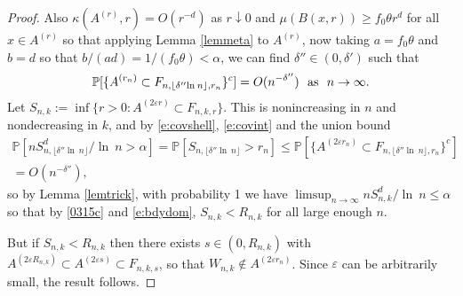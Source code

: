 \documentclass[12pt]{article}
\newcommand{\cX}{\mathcal{X}}
\renewcommand{\Pr}{\mathbb{P}}
\newcommand{\eps}{\varepsilon}
\newcommand{\dist}{{\rm dist}}
\renewcommand{\log}{{\ln \:}}
\begin{document}
\begin{proof}
	Also $\kappa(A^{(r)},r) = O(r^{-d})$ as $r \downarrow 0$ and
	$\mu(B(x,r)) \geq f_0 \theta r^d$ for all $x \in A^{(r)}$ so that
	applying  Lemma \ref{lemmeta} to $A^{(r)}$, now
	taking $a = f_0 \theta$ and $b = d$ so
	that $b/(ad) = 1/ (f_0 \theta) < \alpha$, we can find
	 $\delta'' \in(0,\delta')$ such that
	\begin{align}
		\Pr[  \{ A^{(r_n)}
	\subset F_{n,\lfloor \delta'' \log n \rfloor, r_n} \}^c]
	= O (n^{-\delta''}) ~~ {\rm as}~~ n \to \infty.
		\label{e:covint}
	\end{align}
	Let $S_{n,k}:= \inf \{r >0:A^{(2 \eps r)}
	\subset F_{n,k,r} \}$. This is nonincreasing in $n$ and nondecreasing
	in $k$, and by \eqref{e:covshell}, \eqref{e:covint} 
	and the union bound
	\begin{align*}
	\Pr[  n  S_{n,\lfloor \delta'' \log n\rfloor}^d/\log n > \alpha ] 
	= \Pr[ S_{n,\lfloor \delta'' \log n\rfloor}  > r_n] \leq
		\Pr[ \{A^{(2 \eps 
		r_n)} \subset F_{n,\lfloor \delta'' \log n\rfloor,r_n} \}^c]
		\\
	= O(n^{-\delta''}),
		\end{align*}
	so by Lemma \ref{lemtrick}, with probability 1 we have
	$\limsup_{ n \to \infty} n  S_{n,k}^d/\log n \leq \alpha
	$
	so that by \eqref{0315c} and \eqref{e:bdydom}, 
	$S_{n,k} < R_{n,k}$ for all large enough $n$. 
	 
	 But if $S_{n,k} < R_{n,k}$ then there exists $s \in (0, R_{n,k})
	 $ with $A^{(2 \eps R_{n,k})} \subset A^{(2 \eps s)} \subset F_{n,k,s}$,
	 so that
%
$W_{n,k} \notin A^{(2 \eps r_n)}$.
	Since $\eps$ can be arbitrarily small, the result follows.
\end{proof}
\end{document}
